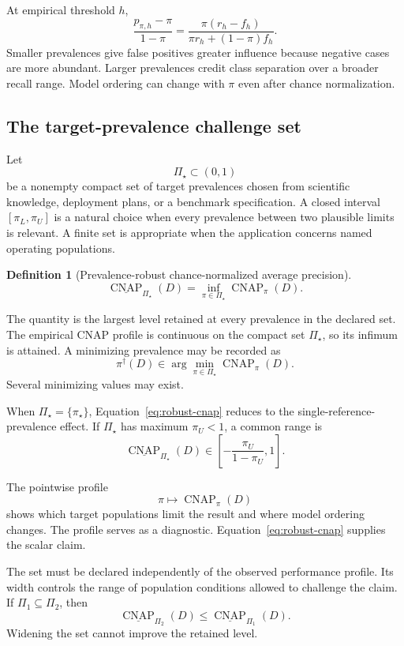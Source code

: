\documentclass[11pt]{article}
\newcommand{\CNAP}{\operatorname{CNAP}}
\newcommand{\PSet}{\Pi_\star}
\newcommand{\RobCNAP}{\underline{\CNAP}_{\PSet}}
\newtheorem{definition}{Definition}
\theoremstyle{remark}
\begin{document}
At empirical threshold $h$,
\begin{equation}
\frac{p_{\pi,h}-\pi}{1-\pi}
=
\frac{\pi(r_h-f_h)}
{\pi r_h+(1-\pi)f_h}.
\label{eq:threshold-cnap}
\end{equation}
Smaller prevalences give false positives greater influence because negative cases are more abundant. Larger prevalences credit class separation over a broader recall range. Model ordering can change with $\pi$ even after chance normalization.

\subsection{The target-prevalence challenge set}

Let
\[
\PSet\subset(0,1)
\]
be a nonempty compact set of target prevalences chosen from scientific knowledge, deployment plans, or a benchmark specification. A closed interval $[\pi_L,\pi_U]$ is a natural choice when every prevalence between two plausible limits is relevant. A finite set is appropriate when the application concerns named operating populations.

\begin{definition}[Prevalence-robust chance-normalized average precision]
\begin{equation}
\RobCNAP(D)
=
\inf_{\pi\in\PSet}\CNAP_\pi(D).
\label{eq:robust-cnap}
\end{equation}
\end{definition}

The quantity is the largest level retained at every prevalence in the declared set. The empirical CNAP profile is continuous on the compact set $\PSet$, so its infimum is attained. A minimizing prevalence may be recorded as
\[
\pi^\dagger(D)
\in
\arg\min_{\pi\in\PSet}\CNAP_\pi(D).
\]
Several minimizing values may exist.

When $\PSet=\{\pi_\star\}$, Equation~\eqref{eq:robust-cnap} reduces to the single-reference-prevalence effect. If $\PSet$ has maximum $\pi_U<1$, a common range is
\[
\RobCNAP(D)
\in
\left[-\frac{\pi_U}{1-\pi_U},1\right].
\]

The pointwise profile
\[
\pi\longmapsto\CNAP_\pi(D)
\]
shows which target populations limit the result and where model ordering changes. The profile serves as a diagnostic. Equation~\eqref{eq:robust-cnap} supplies the scalar claim.

The set must be declared independently of the observed performance profile. Its width controls the range of population conditions allowed to challenge the claim. If $\Pi_1\subseteq\Pi_2$, then
\[
\underline{\CNAP}_{\Pi_2}(D)
\leq
\underline{\CNAP}_{\Pi_1}(D).
\]
Widening the set cannot improve the retained level.
\end{document}
